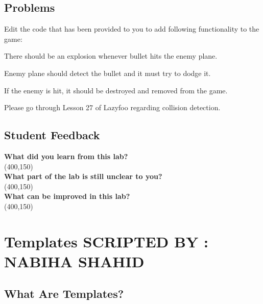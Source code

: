 \documentclass[11pt,fleqn]{book} %
\begin{document}
 \section{Problems}
 Edit the code that has been provided to you to add following functionality to the game:\\
 \begin{problem} There should be an explosion whenever bullet hits the enemy plane.\\
 \end{problem}
 \begin{problem} Enemy plane should detect the bullet and it must try to dodge it.\\
 \end{problem}
 \begin{problem} If the enemy is hit, it should be destroyed and removed from the game.
 \end{problem}
 
 \begin{tcolorbox}[width=\textwidth,colback={white},title={KEYNOTE},colbacktitle=purple!50!white,coltitle=black] 
 	Please go through Lesson 27 of Lazyfoo regarding collision detection.
 \end{tcolorbox}
 
 \newpage
 \section{Student Feedback}
 \textbf{What did you learn from this lab?}\\ 
 \framebox(400,150){}\\
 \textbf{What part of the lab is still unclear to you?}\\
 \framebox(400,150){}\\
 \textbf{What can be improved in this lab?}\\ 
 \framebox(400,150){}\\

\newpage
{} %
\chapter{Templates \hspace{65mm} {\textsc{\small SCRIPTED BY : NABIHA SHAHID}}}

\section{What Are Templates?}
\end{document}
